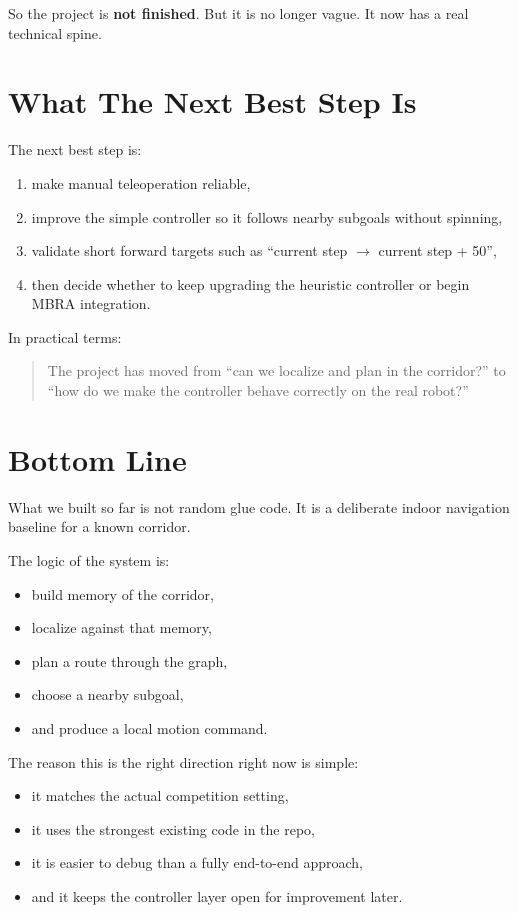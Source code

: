 \documentclass[11pt,a4paper]{article}
\begin{document}
So the project is \textbf{not finished}.  But it is no longer vague.  It now
has a real technical spine.


\section{What The Next Best Step Is}

The next best step is:

\begin{enumerate}[nosep]
  \item make manual teleoperation reliable,
  \item improve the simple controller so it follows nearby subgoals without
        spinning,
  \item validate short forward targets such as ``current step $\rightarrow$
        current step + 50'',
  \item then decide whether to keep upgrading the heuristic controller or begin
        MBRA integration.
\end{enumerate}

In practical terms:

\begin{quote}
The project has moved from ``can we localize and plan in the corridor?'' to
``how do we make the controller behave correctly on the real robot?''
\end{quote}


\section{Bottom Line}

What we built so far is not random glue code.  It is a deliberate indoor
navigation baseline for a known corridor.

The logic of the system is:

\begin{itemize}[nosep]
  \item build memory of the corridor,
  \item localize against that memory,
  \item plan a route through the graph,
  \item choose a nearby subgoal,
  \item and produce a local motion command.
\end{itemize}

The reason this is the right direction right now is simple:

\begin{itemize}[nosep]
  \item it matches the actual competition setting,
  \item it uses the strongest existing code in the repo,
  \item it is easier to debug than a fully end-to-end approach,
  \item and it keeps the controller layer open for improvement later.
\end{itemize}
\end{document}
